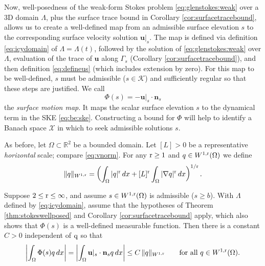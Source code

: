 \documentclass[hidelinks,onefignum,onetabnum,final]{siamart220329}  %
\newcommand{\RR}{\mathbb{R}}
\newcommand{\grad}{\nabla}
\newcommand{\bn}{\mathbf{n}}
\newcommand{\bu}{\mathbf{u}}
\newcommand{\cK}{\mathcal{K}}
\newcommand{\cX}{\mathcal{X}}
\newcommand{\qq}{{\text{\textnormal{q}}}}
\newcommand{\rr}{{\text{\textnormal{r}}}}
\begin{document}
Now, well-posedness of the weak-form Stokes problem \eqref{eq:glenstokes:weak} over a 3D domain $\Lambda$, plus the surface trace bound in Corollary \ref{cor:surfacetracebound}, allows us to create a well-defined map from an admissible surface elevation $s$ to the corresponding surface velocity solution $\bu|_s$.  The map is defined via definition \eqref{eq:icydomain} of $\Lambda=\Lambda(t)$, followed by the solution of \eqref{eq:glenstokes:weak} over $\Lambda$, evaluation of the trace of $\bu$ along $\Gamma_s$ (Corollary \ref{cor:surfacetracebound}), and then definition \eqref{eq:defineus} (which includes extension by zero).  For this map to be well-defined, $s$ must be admissible ($s\in\cK$) and sufficiently regular so that these steps are justified.  We call
\begin{equation}
\Phi(s) = - \bu|_s\cdot \bn_s \label{eq:definePhi:asfunction}
\end{equation}
the \emph{surface motion map}.  It maps the scalar surface elevation $s$ to the dynamical term in the SKE \eqref{eq:be:ske}.  Constructing a bound for $\Phi$ will help to identify a Banach space $\cX$ in which to seek admissible solutions $s$.

As before, let $\Omega \subset \RR^2$ be a bounded domain.  Let $[L]>0$ be a representative \emph{horizontal} scale; compare \eqref{eq:vnorm}.  For any $\rr\ge 1$ and $q\in W^{1,\rr}(\Omega)$ we define
\begin{equation}
\|q\|_{W^{1,\rr}} = \left(\int_\Omega |q|^\rr\,dx + [L]^\rr \int_\Omega |\grad q|^\rr\,dx\right)^{1/\rr}. \label{eq:norm:Omega}
\end{equation}

\begin{lemma} \label{lem:phibound:early}  Suppose $2 \le \rr \le \infty$, and assume $s\in W^{1,\rr}(\Omega)$ is admissible ($s\ge b$).  With $\Lambda$ defined by \eqref{eq:icydomain}, assume that the hypotheses of Theorem \ref{thm:stokeswellposed} and Corollary \ref{cor:surfacetracebound} apply, which also shows that $\Phi(s)$ is a well-defined measurable function.  Then there is a constant $C>0$ independent of $\qq$ so that
\begin{equation}
\left|\int_\Omega \Phi(s) q\,dx\right| = \left|\int_\Omega \bu|_s\cdot \bn_s q\,dx\right| \le C\, \|q\|_{W^{1,\rr}} \qquad \text{for all } q\in W^{1,\rr}(\Omega).  \label{eq:phibound:early}
\end{equation}
\end{lemma}
\end{document}
